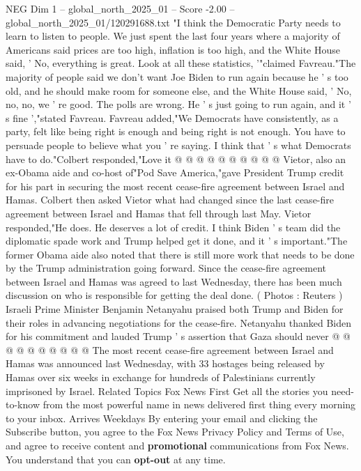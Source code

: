 \begin{textsample}{NEG Dim 1 – global\_north\_2025\_01 – Score -2.00 – global\_north\_2025\_01/120291688.txt}  \label{ex:f1_neg_081}
"I think the Democratic Party needs to learn to listen to people.
We just spent the last four years where a majority of Americans said prices are too high, inflation is too high, and the White House said, ' No, everything is great.
Look at all these statistics, '"claimed Favreau."The majority of people said we don't want Joe Biden to run again because he ' s too old, and he should make room for someone else, and the White House said, ' No, no, no, we ' re good.
The polls are wrong.
He ' s just going to run again, and it ' s fine ',"stated Favreau.
Favreau added,"We Democrats have consistently, as a party, felt like being right is enough and being right is not enough.
You have to persuade people to believe what you ' re saying.
I think that ' s what Democrats have to do."Colbert responded,"Love it @ @ @ @ @ @ @ @ @ @ Vietor, also an ex-Obama aide and co-host of"Pod Save America,"gave President Trump credit for his part in securing the most recent cease-fire agreement between Israel and Hamas.
Colbert then asked Vietor what had changed since the last cease-fire agreement between Israel and Hamas that fell through last May.
Vietor responded,"He does.
He deserves a lot of credit.
I think Biden ' s team did the diplomatic spade work and Trump helped get it done, and it ' s important."The former Obama aide also noted that there is still more work that needs to be done by the Trump administration going forward.
Since the cease-fire agreement between Israel and Hamas was agreed to last Wednesday, there has been much discussion on who is responsible for getting the deal done. ( Photos : Reuters ) Israeli Prime Minister Benjamin Netanyahu praised both Trump and Biden for their roles in advancing negotiations for the cease-fire.
Netanyahu thanked Biden for his commitment and lauded Trump ' s assertion that Gaza should never @ @ @ @ @ @ @ @ @ @ The most recent cease-fire agreement between Israel and Hamas was announced last Wednesday, with 33 hostages being released by Hamas over six weeks in exchange for hundreds of Palestinians currently imprisoned by Israel.
Related Topics Fox News First Get all the stories you need-to-know from the most powerful name in news delivered first thing every morning to your inbox.
Arrives Weekdays By entering your email and clicking the Subscribe button, you agree to the Fox News Privacy Policy and Terms of Use, and agree to receive content and \textbf{promotional} communications from Fox News.
You understand that you can \textbf{opt-out} at any time.

\end{textsample}
